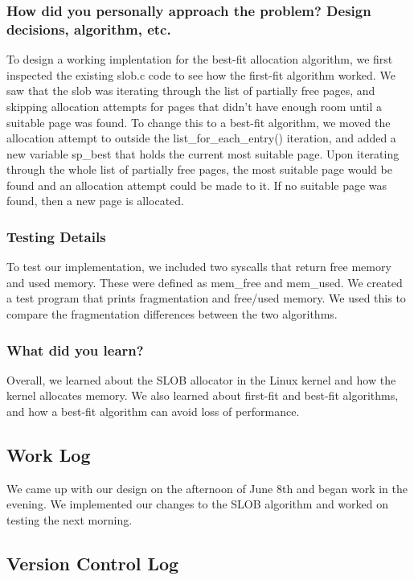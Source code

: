 \documentclass[journal, letterpaper, draftclsnofoot, onecolumn, 10pt]{IEEEtran}
\begin{document}
\subsubsection{How did you personally approach the problem? Design decisions, algorithm, etc.}



To design a working implentation for the best-fit allocation algorithm, we first inspected the existing slob.c code to see how the first-fit algorithm worked.
We saw that the slob was iterating through the list of partially free pages, and skipping allocation attempts for pages that didn't have enough room until a suitable page was found.
To change this to a best-fit algorithm, we moved the allocation attempt to outside the list\_for\_each\_entry() iteration, and added a new variable sp\_best that holds the current most suitable page.
Upon iterating through the whole list of partially free pages, the most suitable page would be found and an allocation attempt could be made to it. If no suitable page was found, then a new page is allocated. \\


\subsubsection{Testing Details}

To test our implementation, we included two syscalls that return free memory and used memory. These were defined as mem\_free and mem\_used.
We created a test program that prints fragmentation and free/used memory. We used this to compare the fragmentation differences between the two algorithms. \\



\subsubsection{What did you learn?}

Overall, we learned about the SLOB allocator in the Linux kernel and how the kernel allocates memory.
We also learned about first-fit and best-fit algorithms, and how a best-fit algorithm can avoid loss of performance. \\


\subsection{Work Log}
We came up with our design on the afternoon of June 8th and began work in the evening. We implemented our changes to the SLOB algorithm and worked on testing the next morning.


\clearpage
\subsection{Version Control Log}



\FloatBarrier



\scalebox{0.8}{
}


\FloatBarrier
\end{document}
